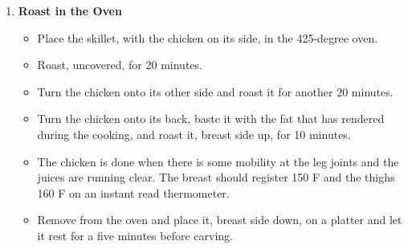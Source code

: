 \documentclass[11pt,letterpaper]{article}
\begin{document}
\begin {description}
\begin{enumerate}
\item{\bf Roast in the Oven}
\begin{itemize}
\item Place the skillet, with the chicken on its side, in the 425-degree oven. 
\item Roast, uncovered, for 20 minutes. 
\item Turn the chicken onto its other side and roast it for another 20 minutes.
\item Turn the chicken onto its back, baste it with the fat that has rendered during the cooking, and roast it, breast side up, for 10 minutes.
\item The chicken is done when there is some mobility at the leg joints and the juices are running clear. The breast should register 150 F and the thighs 160 F on an instant read thermometer.
\item Remove from the oven and place it, breast side down, on a platter and let it rest for a five minutes before carving.
\end{itemize}
\end{enumerate}
\end{description}
\end{document}
